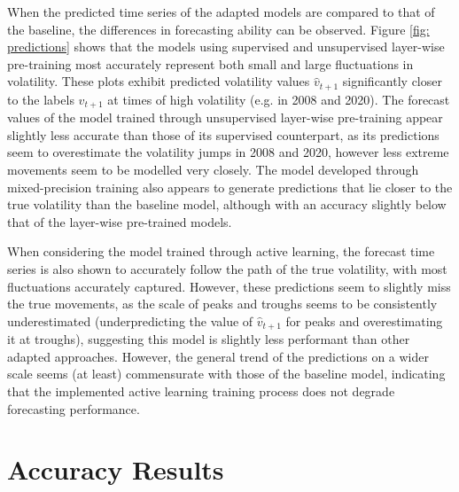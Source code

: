 \documentclass[a4paper, 11pt]{report}
\begin{document}
    When the predicted time series of the adapted models are compared to that of the baseline, the differences in forecasting ability can be observed. Figure \ref{fig: predictions} shows that the models using supervised and unsupervised layer-wise pre-training most accurately represent both small and large fluctuations in volatility. These plots exhibit predicted volatility values $\hat{v}_{t+1}$ significantly closer to the labels $v_{t+1}$ at times of high volatility (e.g. in 2008 and 2020). The forecast values of the model trained through unsupervised layer-wise pre-training appear slightly less accurate than those of its supervised counterpart, as its predictions seem to overestimate the volatility jumps in 2008 and 2020, however less extreme movements seem to be modelled very closely. The model developed through mixed-precision training also appears to generate predictions that lie closer to the true volatility than the baseline model, although with an accuracy slightly below that of the layer-wise pre-trained models.

    When considering the model trained through active learning, the forecast time series is also shown to accurately follow the path of the true volatility, with most fluctuations accurately captured. However, these predictions seem to slightly miss the true movements, as the scale of peaks and troughs seems to be consistently underestimated (underpredicting the value of $\hat{v}_{t+1}$ for peaks and overestimating it at troughs), suggesting this model is slightly less performant than other adapted approaches. However, the general trend of the predictions on a wider scale seems (at least) commensurate with those of the baseline model, indicating that the implemented active learning training process does not degrade forecasting performance.


    \section{Accuracy Results}
\end{document}
